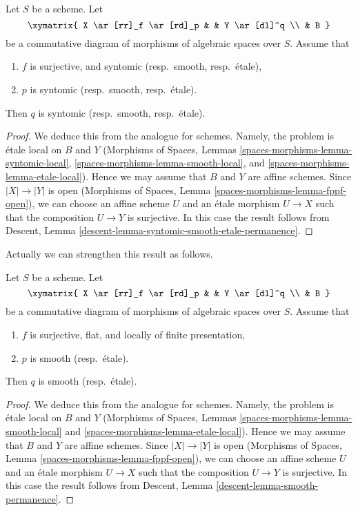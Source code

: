 \begin{lemma}
\label{lemma-syntomic-smooth-etale-permanence}
Let $S$ be a scheme. Let
$$
\xymatrix{
X \ar[rr]_f \ar[rd]_p & &
Y \ar[dl]^q \\
& B
}
$$
be a commutative diagram of morphisms of algebraic spaces over $S$.
Assume that
\begin{enumerate}
\item $f$ is surjective, and syntomic (resp.\ smooth, resp.\ \'etale),
\item $p$ is syntomic (resp.\ smooth, resp.\ \'etale).
\end{enumerate}
Then $q$ is syntomic (resp.\ smooth, resp.\ \'etale).
\end{lemma}

\begin{proof}
We deduce this from the analogue for schemes.
Namely, the problem is \'etale local on $B$ and $Y$
(Morphisms of Spaces, Lemmas
\ref{spaces-morphisms-lemma-syntomic-local},
\ref{spaces-morphisms-lemma-smooth-local}, and
\ref{spaces-morphisms-lemma-etale-local}).
Hence we may assume that $B$ and $Y$ are affine
schemes. Since $|X| \to |Y|$ is open
(Morphisms of Spaces, Lemma \ref{spaces-morphisms-lemma-fppf-open}),
we can choose an affine
scheme $U$ and an \'etale morphism $U \to X$ such that the
composition $U \to Y$ is surjective. In this case the result
follows from Descent, Lemma
\ref{descent-lemma-syntomic-smooth-etale-permanence}.
\end{proof}

\noindent
Actually we can strengthen this result as follows.

\begin{lemma}
\label{lemma-smooth-permanence}
Let $S$ be a scheme. Let
$$
\xymatrix{
X \ar[rr]_f \ar[rd]_p & &
Y \ar[dl]^q \\
& B
}
$$
be a commutative diagram of morphisms of algebraic spaces over $S$. Assume that
\begin{enumerate}
\item $f$ is surjective, flat, and locally of finite presentation,
\item $p$ is smooth (resp.\ \'etale).
\end{enumerate}
Then $q$ is smooth (resp.\ \'etale).
\end{lemma}

\begin{proof}
We deduce this from the analogue for schemes.
Namely, the problem is \'etale local on $B$ and $Y$
(Morphisms of Spaces, Lemmas
\ref{spaces-morphisms-lemma-smooth-local} and
\ref{spaces-morphisms-lemma-etale-local}).
Hence we may assume that $B$ and $Y$ are affine
schemes. Since $|X| \to |Y|$ is open
(Morphisms of Spaces, Lemma \ref{spaces-morphisms-lemma-fppf-open}),
we can choose an affine
scheme $U$ and an \'etale morphism $U \to X$ such that the
composition $U \to Y$ is surjective. In this case the result
follows from Descent, Lemma
\ref{descent-lemma-smooth-permanence}.
\end{proof}

